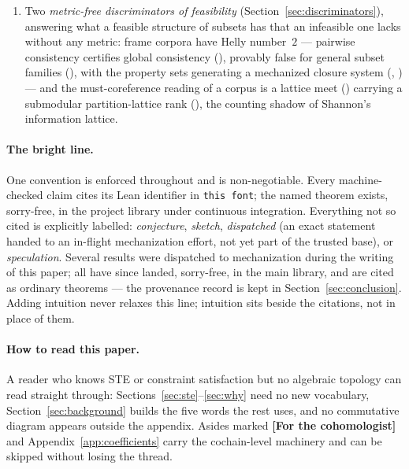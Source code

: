 \documentclass[11pt]{article}
\begin{document}
\begin{enumerate}
  (, in ).
\item Two \emph{metric-free discriminators of feasibility}
  (Section~\ref{sec:discriminators}), answering what a feasible
  structure of subsets has that an infeasible one lacks without any
  metric: frame corpora have Helly number~$2$ --- pairwise
  consistency certifies global consistency
  (), provably false for general subset
  families (), with the property sets
  generating a mechanized closure system (,
  ) --- and the must-coreference reading
  of a corpus is a lattice meet () carrying
  a submodular partition-lattice rank (), the
  counting shadow of Shannon's information lattice.
\end{enumerate}

\paragraph{The bright line.}  One convention is enforced throughout
and is non-negotiable.  Every machine-checked claim cites its Lean
identifier in \texttt{this font}; the named theorem exists, sorry-free,
in the project library under continuous integration.  Everything not
so cited is explicitly labelled: \emph{conjecture}, \emph{sketch},
\emph{dispatched} (an exact statement handed to an in-flight
mechanization effort, not yet part of the trusted base), or
\emph{speculation}.  Several results were dispatched to
mechanization during the writing of this paper; all have since
landed, sorry-free, in the main library, and are cited as ordinary
theorems --- the provenance record is kept in
Section~\ref{sec:conclusion}.  Adding intuition never relaxes this
line; intuition sits beside the citations, not in place of them.

\paragraph{How to read this paper.}  A reader who knows STE or
constraint satisfaction but no algebraic topology can read
straight through: Sections~\ref{sec:ste}--\ref{sec:why} need no new
vocabulary, Section~\ref{sec:background} builds the five words the
rest uses, and no commutative diagram appears outside the appendix.
Asides marked \textbf{[For the cohomologist]} and
Appendix~\ref{app:coefficients} carry the cochain-level machinery and
can be skipped without losing the thread.
\end{document}
